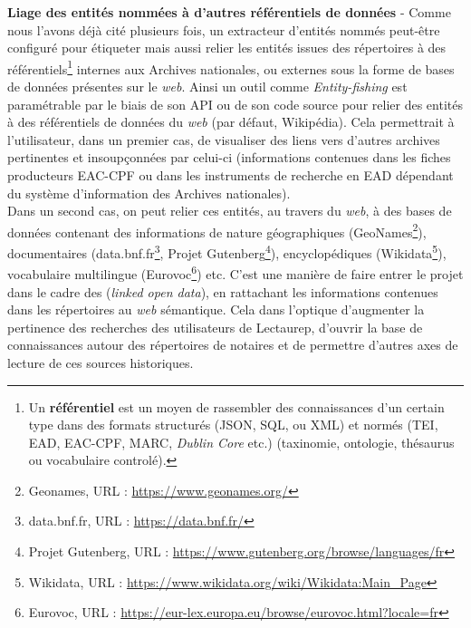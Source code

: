 \newpage
\textbf{Liage des entités nommées à d'autres référentiels de données} - Comme nous l'avons déjà cité plusieurs fois, un extracteur d'entités nommés peut-être configuré pour étiqueter mais aussi relier les entités issues des répertoires à des référentiels\footnote{Un \textbf{référentiel} est un moyen de rassembler des connaissances d'un certain type dans des formats structurés (JSON, SQL, ou XML) et normés (TEI, EAD, EAC-CPF, MARC, \textit{Dublin Core} etc.) (taxinomie, ontologie, thésaurus ou vocabulaire controlé).} internes aux Archives nationales, ou externes sous la forme de bases de données présentes sur le \textit{web}. Ainsi un outil comme \textit{Entity-fishing} est paramétrable par le biais de son API ou de son code source pour relier des entités à des référentiels de données du \textit{web} (par défaut, Wikipédia). Cela permettrait à l'utilisateur, dans un premier cas, de visualiser des liens vers d'autres archives pertinentes et insoupçonnées par celui-ci (informations contenues dans les fiches producteurs EAC-CPF ou dans les instruments de recherche en EAD dépendant du système d'information des Archives nationales).\\ 

Dans un second cas, on peut relier ces entités, au travers du \textit{web}, à des bases de données contenant des informations de nature géographiques (GeoNames\footnote{Geonames, URL : \url{https://www.geonames.org/}}), documentaires (data.bnf.fr\footnote{data.bnf.fr, URL : \url{https://data.bnf.fr/}}, Projet Gutenberg\footnote{Projet Gutenberg, URL : \url{https://www.gutenberg.org/browse/languages/fr}}), encyclopédiques (Wikidata\footnote{Wikidata, URL : \url{https://www.wikidata.org/wiki/Wikidata:Main_Page}}), vocabulaire multilingue (Eurovoc\footnote{Eurovoc, URL : \url{https://eur-lex.europa.eu/browse/eurovoc.html?locale=fr}}) etc. C'est une manière de faire entrer le projet dans le cadre des  (\textit{linked open data}), en rattachant les informations contenues dans les répertoires au \textit{web} sémantique. Cela dans l'optique d'augmenter la pertinence des recherches des utilisateurs de Lectaurep, d'ouvrir la base de connaissances autour des répertoires de notaires et de permettre d'autres axes de lecture de ces sources historiques.\\

